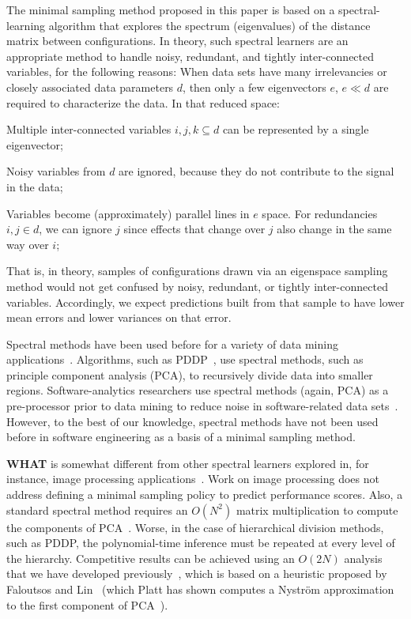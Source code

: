 \documentclass{newsig}
\newcommand{\what}{{\bf WHAT }}
\begin{document}
The minimal sampling method proposed in this paper is based on a spectral-learning algorithm
that  explores the spectrum (eigenvalues) of the distance matrix between  configurations.
In theory, such spectral learners are an appropriate method to handle noisy, redundant, and tightly inter-connected variables, for the following reasons:
When data sets have many irrelevancies or closely associated data parameters $d$, then
only a few eigenvectors $e$, $e \ll d$  are required to characterize the data.
In that reduced space:
\begin{compactitem}
\item
Multiple inter-connected variables $i,j,k \subseteq d$ can be represented
by a single eigenvector;
\item
Noisy variables from $d$ are
ignored, because they  do not contribute to the signal in the data;
\item
Variables  become (approximately) parallel lines
in $e$ space. For  redundancies \mbox{$i,j \in d$}, we
can ignore $j$
since effects that change over $j$ also
change in the same way over $i$;
\end{compactitem}
That is, in theory, samples of configurations drawn via an eigenspace sampling method
would not get confused by noisy, redundant, or tightly inter-connected variables. Accordingly,
we expect predictions built from that sample to have  lower mean errors and lower variances on that error.

Spectral methods have been used before for a variety of data mining applications~\cite{kamvar2003spectral}.
Algorithms, such as PDDP~\cite{boley98}, use spectral methods, such as principle component analysis (PCA), to
recursively divide data into smaller regions.  Software-analytics researchers use spectral methods (again, PCA) as a pre-processor prior to data mining  to reduce noise in software-related data sets~\cite{theisen2015approximating}.
However, to the best of our knowledge, spectral methods have not been used before in software engineering as a basis of a minimal sampling method.


\what is somewhat different from other spectral
learners explored in, for instance, image processing applications~\cite{shi00}.
Work on image processing does not address
defining a minimal sampling policy to predict performance scores.
Also, a standard spectral method requires an $O(N^2)$ matrix multiplication to compute the components
of PCA~\cite{ilin10}. Worse, in the case of hierarchical division methods, such as PDDP,
the polynomial-time inference must be repeated at every level of the hierarchy.
Competitive results can be achieved
using an $O(2N)$ analysis that we have developed previously~\cite{me12d}, which is  based on  a heuristic proposed by Faloutsos and Lin~\cite{Faloutsos1995} (which Platt has shown computes a Nystr\"om approximation to the first component of PCA~\cite{platt05}).
\end{document}
